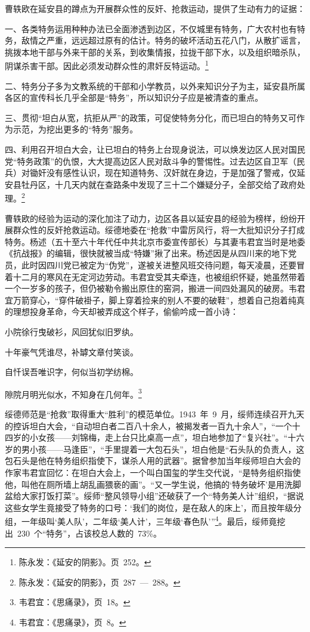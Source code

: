 曹轶欧在延安县的蹲点为开展群众性的反奸、抢救运动，提供了生动有力的证据：

一、各类特务运用种种办法已全面渗透到边区，不仅城里有特务，广大农村也有特务，敌情之严重，远远超过原有的估计。特务的破坏活动五花八门，从散扩谣言，挑拨本地干部与外来干部的关系，到收集情报，拉拢干部下水，以及组织暗杀队，阴谋杀害干部。因此必须发动群众性的肃奸反特运动。\footnote{陈永发：《延安的阴影》。页~252。}

二、特务分子多为文教系统的干部和小学教员，以外来知识分子为主，延安县所属各区的宣传科长几乎全部是“特务”，所以知识分子应是被清查的重点。

三、贯彻“坦白从宽，抗拒从严”的政策，可促使特务分化，而已坦白的特务又可作为示范，为挖出更多的“特务”服务。

四、利用召开坦白大会，让已坦白的特务上台现身说法，可以焕发边区人民对国民党“特务政策”的仇恨，大大提高边区人民对敌斗争的警惕性。过去边区自卫军（民兵）对锄奸没有感性认识，现在知道特务、汉奸就在身边，于是加强了警戒，仅延安县牡丹区，十几天内就在查路条中发现了三十二个嫌疑分子，全部交给了政府处理。\footnote{陈永发：《延安的阴影》，页~287~—~288。}

曹轶欧的经验为运动的深化加注了动力，边区各县以延安县的经验为榜样，纷纷开展群众性的反奸抢救运动。绥德地委在“抢救”中雷厉风行，将一大批知识分子打成特务。杨述（五十至六十年代任中共北京市委宣传部长）与其妻韦君宜当时是地委《抗战报》的编辑，很快就被当成“特嫌”揪了出来。杨述因是从四川来的地下党员，此时因四川党已被定为“伪党”，遂被关进整风班交待问题，每天凌晨，还要冒着十二月的寒风在无定河边劳动。韦君宜受其夫牵连，也被组织怀疑，她虽然带着一个一岁多的孩子，但仍被勒令搬出原住的窑洞，搬进一间四处漏风的破房。韦君宜万箭穿心，“穿件破褂子，脚上穿着捡来的别人不要的破鞋”，想着自己抱着纯真的理想投身革命，今天却被弄成这个样子，偷偷吟成一首小诗：

\begin{quoting}
小院徐行曳破衫，风回犹似旧罗纨。

十年豪气凭谁尽，补罅文章付笑谈。

自忏误吾唯识字，何似当初学纺棉。

隙院月明光似水，不知身在几何年。\footnote{韦君宜：《思痛录》，页~18。}
\end{quoting}

绥德师范是“抢救”取得重大“胜利”的模范单位。1943~年~9~月，绥师连续召开九天的控诉坦白大会，“自动坦白者二百八十余人，被揭发者一百九十余人”，“一个十四岁的小女孩——刘锦梅，走上台只比桌高一点”，坦白地参加了“复兴社”。“十六岁的男小孩——马逢臣”，“手里提着一大包石头”，坦白他是“石头队的负责人，这包石头是他在特务组织指使下，谋杀人用的武器”。据曾参加当年绥师坦白大会的作家韦君宜回忆：在坦白大会上，一个叫白国玺的学生交代说，“是特务组织指使他，叫他在厕所墙上胡乱画猥亵的画”。“又一学生说，他搞的‘特务破坏’是用洗脚盆给大家打饭打菜”。绥师“整风领导小组”还破获了一个“特务美人计”组织，“据说这些女学生竟接受了特务的口号：‘我们的岗位，是在敌人的床上’，而且按年级分组，一年级叫‘美人队’，二年级‘美人计’，三年级‘春色队’”\footnote{韦君宜：《思痛录》，页~8。}。最后，绥师竟挖出~230~个“特务”，占该校总人数的~73\%。

